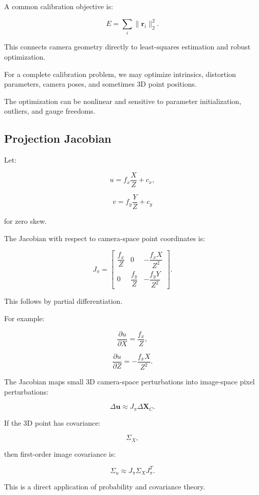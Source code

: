 A common calibration objective is:

\[
 \boxed{ E= \sum_i \|\mathbf r_i\|_2^2 }.
\]

This connects camera geometry directly to least-squares estimation and robust optimization.

For a complete calibration problem, we may optimize intrinsics, distortion parameters, camera poses, and sometimes 3D point positions.

The optimization can be nonlinear and sensitive to parameter initialization, outliers, and gauge freedoms.

\subsection{Projection Jacobian}\label{02-foundations-ii-ch035-projection-jacobian}

\hypertarget{02-foundations-ii-ch035-projection-jacobian}{}

Let:

\[
 u=f_x\frac XZ+c_x,
\]

\[
 v=f_y\frac YZ+c_y
\]

for zero skew.

The Jacobian with respect to camera-space point coordinates is:

\[
 \boxed{ J_\pi= \begin{bmatrix} \dfrac{f_x}{Z}&0&-\dfrac{f_xX}{Z^2}\\ 0&\dfrac{f_y}{Z}&-\dfrac{f_yY}{Z^2} \end{bmatrix} }.
\]

This follows by partial differentiation.

For example:

\[
 \frac{\partial u}{\partial X}=\frac{f_x}{Z},
\]

\[
 \frac{\partial u}{\partial Z}=-\frac{f_xX}{Z^2}.
\]

The Jacobian maps small 3D camera-space perturbations into image-space pixel perturbations:

\[
 \boxed{ \Delta\mathbf u\approx J_\pi\Delta\mathbf X_C }.
\]

If the 3D point has covariance:

\[
 \Sigma_X,
\]

then first-order image covariance is:

\[
 \boxed{ \Sigma_u\approx J_\pi\Sigma_XJ_\pi^T }.
\]

This is a direct application of probability and covariance theory.

